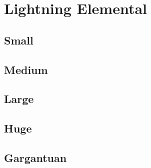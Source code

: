 \section{Lightning Elemental}

\subsection{Small}

\subsection{Medium}

\subsection{Large}

\subsection{Huge}

\subsection{Gargantuan}